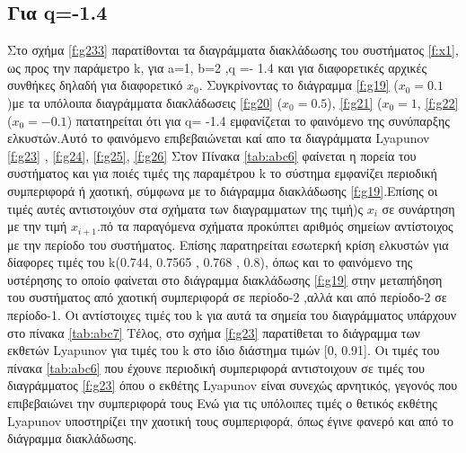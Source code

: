 \subsection{Για q=-1.4}
Στο σχήμα \ref{f:g233} παρατίθονται τα διαγράμματα διακλάδωσης του συστήματος \ref{f:x1}, ως προς την παράμετρο k, για a=1, b=2 ,q =- 1.4 και για διαφορετικές αρχικές συνθήκες δηλαδή για διαφορετικό \(x_0\). Συγκρίνοντας το διάγραμμα \ref{f:g19} (\(x_0=0.1\))με τα υπόλοιπα διαγράμματα διακλάδωσεις \ref{f:g20} (\(x_0=0.5\)), \ref{f:g21} (\(x_0=1\), \ref{f:g22} (\(x_0=-0.1\)) πατατηρείται ότι για q= -1.4 εμφανίζεται το φαινόμενο της συνύπαρξης ελκυστών.Αυτό το φαινόμενο επιβεβαιώνεται καί απο τα διαγράμματα Lyapunov \ref{f:g23} , \ref{f:g24},  \ref{f:g25},  \ref{f:g26} 
Στον Πίνακα \ref{tab:abc6} φαίνεται η πορεία του συστήματος και για ποιές τιμές της παραμέτρου  k το σύστημα εμφανίζει περιοδική συμπεριφορά ή χαοτική, σύμφωνα με το διάγραμμα διακλάδωσης \ref{f:g19}.Επίσης οι τιμές αυτές αντιστοιχόυν στα σχήματα των διαγραμματων της τιμή)ς \(x_i\) σε συνάρτηση με την τιμή \(x_{i+1}\).πό τα παραγόμενα σχήματα προκύπτει αριθμός σημείων αντίστοιχος με την περίοδο του συστήματος.
Επίσης παρατηρείται εσωτερκή κρίση ελκυστών για δίαφορες τιμές του k(0.744, 0.7565 , 0.768 , 0.8), όπως και το φαινόμενο της υστέρησης το οποίο φαίνεται στο διάγραμμα διακλάδωσης \ref{f:g19} στην μεταπήδηση του συστήματος από χαοτική συμπεριφορά σε περίοδο-2 ,αλλά και από περίοδο-2 σε περίοδο-1. Οι αντίστοιχες τιμές του k για αυτά τα σημεία του διαγράμματος υπάρχουν στο πίνακα \ref{tab:abc7}
Τέλος, στο σχήμα \ref{f:g23} παρατίθεται το διάγραμμα των εκθετών Lyapunov για τιμές του k στο ίδιο διάστημα τιμών [0, 0.91]. Οι τιμές του πίνακα \ref{tab:abc6} που έχουνε περιοδική συμπεριφορά αντιστοιχουν σε τιμές του διαγράμματος \ref{f:g23} όπου ο εκθέτης Lyapunov είναι συνεχώς αρνητικός, γεγονός που επιβεβαιώνει την συμπεριφορά τους Ενώ για τις υπόλοιπες τιμές ο θετικός εκθέτης Lyapunov υποστηρίζει την χαοτική τους συμπεριφορά, όπως έγινε φανερό και από το διάγραμμα διακλάδωσης.

